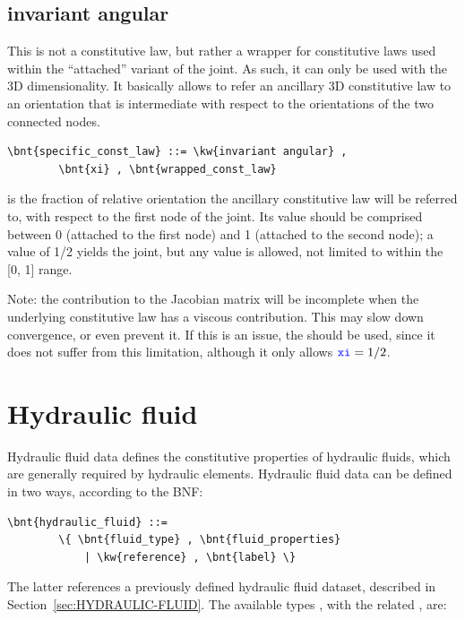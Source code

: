 \subsection{invariant angular}
This is not a constitutive law, but rather a wrapper
for constitutive laws used within the ``attached'' variant
of the  joint.
As such, it can only be used with the 3D dimensionality.
It basically allows to refer an ancillary 3D constitutive law
to an orientation that is intermediate with respect to the orientations
of the two connected nodes.
\begin{Verbatim}[commandchars=\\\{\}]
    \bnt{specific_const_law} ::= \kw{invariant angular} ,
        \bnt{xi} , \bnt{wrapped_const_law}
\end{Verbatim}
 is the fraction of relative orientation the ancillary
constitutive law will be referred to, with respect
to the first node of the joint.
Its value should be comprised between 0 (attached to the first node)
and 1 (attached to the second node); a value of 1/2 yields
the 
joint, but any value is allowed, not limited to within the [0, 1] range.

Note: the contribution to the Jacobian matrix will be incomplete
when the underlying constitutive law has a viscous contribution.
This may slow down convergence, or even prevent it.
If this is an issue,
the 
should be used, since it does not suffer from this limitation,
although it only allows $\textcolor{blue}{\texttt{xi}} = 1/2$.

\section{Hydraulic fluid}\label{sec:HydraulicFluid}
Hydraulic fluid data defines the constitutive properties
of hydraulic fluids, which are generally required by hydraulic elements.
Hydraulic fluid data can be defined in two ways, according to the BNF:
\begin{Verbatim}[commandchars=\\\{\}]
    \bnt{hydraulic_fluid} ::=
        \{ \bnt{fluid_type} , \bnt{fluid_properties}
            | \kw{reference} , \bnt{label} \}
\end{Verbatim}
The latter references a previously defined hydraulic fluid dataset,
described in Section~\ref{sec:HYDRAULIC-FLUID}.
The available types ,
with the related , are:

